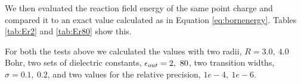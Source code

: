 \documentclass[../master_thesis.tex]{subfiles}
\begin{document}
We then evaluated the reaction field energy of the same point charge and compared it
to an exact value calculated as in Equation  \ref{eq:bornenergy}. Tables \ref{tab:Er2}
and \ref{tab:Er80} show this.

For both the tests above we calculated the values with two radii, $R = 3.0,\ 4.0$ Bohr,
two sets of dielectric constants, $\epsilon_{out} = 2,\ 80$, two transition widths, $\sigma = 0.1,\ 0.2$,
and two values for the relative precision, $1e-4,\ 1e-6$.

\begin{table}[!htbp]
\caption[Reaction charge for $\epsinf = 2$]{Reaction charge for a point charge of $q = 3$ and $\epsinf = 2$ calculated with differing precision, transition width ($\sigma$) and cavity radius (Bohr) compared to the exact values}
\label{tab:Intgamma2}
\end{table}
\end{document}
